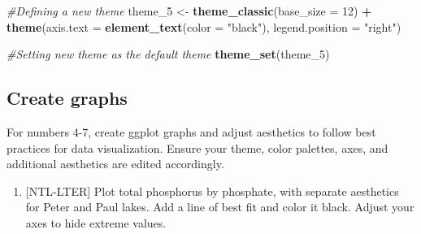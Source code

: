 \documentclass[]{article}
\newenvironment{Shaded}{\begin{snugshade}}{\end{snugshade}}
\newcommand{\CommentTok}[1]{\textcolor[rgb]{0.56,0.35,0.01}{\textit{#1}}}
\newcommand{\DataTypeTok}[1]{\textcolor[rgb]{0.13,0.29,0.53}{#1}}
\newcommand{\DecValTok}[1]{\textcolor[rgb]{0.00,0.00,0.81}{#1}}
\newcommand{\KeywordTok}[1]{\textcolor[rgb]{0.13,0.29,0.53}{\textbf{#1}}}
\newcommand{\NormalTok}[1]{#1}
\newcommand{\OperatorTok}[1]{\textcolor[rgb]{0.81,0.36,0.00}{\textbf{#1}}}
\newcommand{\StringTok}[1]{\textcolor[rgb]{0.31,0.60,0.02}{#1}}
\providecommand{\tightlist}{%
  \setlength{\itemsep}{0pt}\setlength{\parskip}{0pt}}
\begin{document}
\begin{Shaded}
\begin{Highlighting}[]
\CommentTok{#Defining a new theme}
\NormalTok{theme_}\DecValTok{5}\NormalTok{ <-}\StringTok{ }\KeywordTok{theme_classic}\NormalTok{(}\DataTypeTok{base_size =} \DecValTok{12}\NormalTok{) }\OperatorTok{+}
\StringTok{  }\KeywordTok{theme}\NormalTok{(}\DataTypeTok{axis.text =} \KeywordTok{element_text}\NormalTok{(}\DataTypeTok{color =} \StringTok{"black"}\NormalTok{), }
        \DataTypeTok{legend.position =} \StringTok{"right"}\NormalTok{)}

\CommentTok{#Setting new theme as the default theme}
\KeywordTok{theme_set}\NormalTok{(theme_}\DecValTok{5}\NormalTok{)}
\end{Highlighting}
\end{Shaded}

\hypertarget{create-graphs}{%
\subsection{Create graphs}\label{create-graphs}}

For numbers 4-7, create ggplot graphs and adjust aesthetics to follow
best practices for data visualization. Ensure your theme, color
palettes, axes, and additional aesthetics are edited accordingly.

\begin{enumerate}
\def\labelenumi{\arabic{enumi}.}
\setcounter{enumi}{3}
\tightlist
\item
  {[}NTL-LTER{]} Plot total phosphorus by phosphate, with separate
  aesthetics for Peter and Paul lakes. Add a line of best fit and color
  it black. Adjust your axes to hide extreme values.
\end{enumerate}
\end{document}
